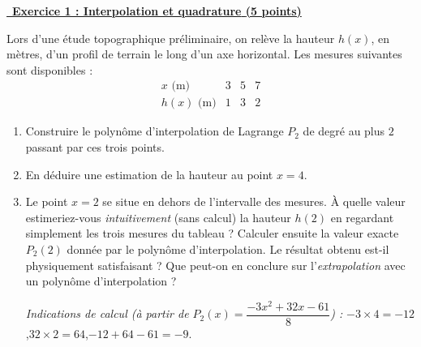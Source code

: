 \vspace{1.5em}

\underline{\, \bf{Exercice 1 : Interpolation et quadrature} \bf{(5 points)}}
\bigskip

Lors d'une étude topographique préliminaire, on relève la hauteur $h(x)$, en mètres, d'un profil de terrain le long d'un axe horizontal. Les mesures suivantes sont disponibles :
\[
\begin{array}{c|ccc}
x \text{ (m)} & 3 & 5 & 7 \\
\hline
h(x) \text{ (m)} & 1 & 3 & 2
\end{array}
\]

\begin{enumerate}
    \item Construire le polynôme d'interpolation de Lagrange $P_2$ de degré au plus $2$ passant par ces trois points.
    \item En déduire une estimation de la hauteur au point $x=4$.
    \item Le point $x=2$ se situe en dehors de l'intervalle des mesures. À quelle valeur estimeriez-vous \emph{intuitivement} (sans calcul) la hauteur $h(2)$ en regardant simplement les trois mesures du tableau ? Calculer ensuite la valeur exacte $P_2(2)$ donnée par le polynôme d'interpolation. Le résultat obtenu est-il physiquement satisfaisant ? Que peut-on en conclure sur l'\emph{extrapolation} avec un polynôme d'interpolation ?

    \textit{Indications de calcul (à partir de $P_2(x)=\dfrac{-3x^2+32x-61}{8}$) :}
    $-3\times 4=-12$,\quad $32\times 2=64$,\quad $-12+64-61=-9$.
\end{enumerate}
